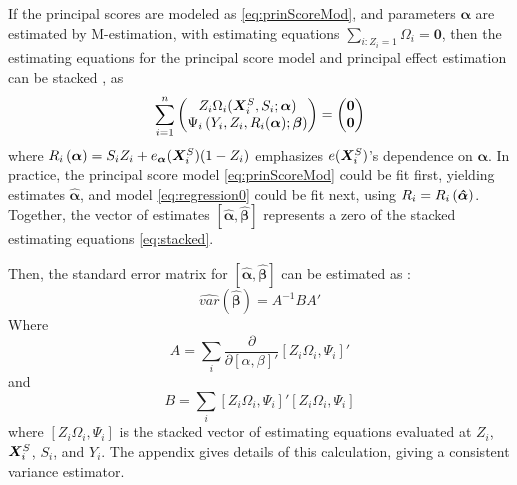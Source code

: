 \documentclass{statsoc} %
\begin{document}
If the principal scores are modeled as \eqref{eq:prinScoreMod}, and parameters $\bm{\alpha}$ are estimated by M-estimation, with estimating equations $\sum_{i: Z_i=1}\Omega_i=\bm{0}$, then the estimating equations for the principal score model and principal effect estimation can be stacked \citep[c.f.][]{boosStefanskiBook}, as
\begin{equation}\label{eq:stacked}
  \sum_{i=1}^n \begin{pmatrix}
    Z_i\Omega_i(\bm{X}^S_i,S_i;\bm{\alpha})\\
    \Psi_i\left(Y_i,Z_i,R_i(\bm{\alpha}); \bm{\beta}\right)\end{pmatrix}=\begin{pmatrix} \bm{0}\\\bm{0}\end{pmatrix}
\end{equation}
where $R_i\left(\bm{\alpha}\right)=S_iZ_i+e_{\bm{\alpha}}(\bm{X}^S_i)(1-Z_i)$ emphasizes $e(\bm{X}^S_i)$'s dependence on $\bm{\alpha}$.
In practice, the principal score model \eqref{eq:prinScoreMod} could be fit first, yielding estimates $\bm{\hat{\alpha}}$, and model \eqref{eq:regression0} could be fit next, using $R_i=R_i\left(\bm{\hat{\alpha}}\right)$.
Together, the vector of estimates $[\bm{\hat{\alpha}},\bm{\hat{\beta}}]$ represents a zero of the stacked estimating equations \eqref{eq:stacked}.

Then, the standard error matrix for $[\bm{\hat{\alpha}},\bm{\hat{\beta}}]$ can be estimated as \citep[][ch. 7]{boosStefanskiBook}:
\begin{equation}\label{eq:sandwich}
  \widehat{var}(\bm{\hat{\beta}})=A^{-1}BA'
\end{equation}
Where
\begin{equation*}
  A=\sum_i\frac{\partial}{\partial [\alpha,\beta]'} [Z_i\Omega_i,\Psi_i]'
\end{equation*}
and
\begin{equation*}%
  B=\sum_i [Z_i\Omega_i, \Psi_i]'[Z_i\Omega_i, \Psi_i]
\end{equation*}
where $[Z_i \Omega_i, \Psi_i]$ is the stacked vector of estimating equations evaluated at $Z_i$, $\bm{X}^S_i$, $S_i$, and $Y_i$.
The appendix gives details of this calculation, giving a consistent variance estimator.
\end{document}
